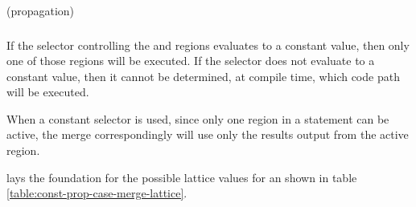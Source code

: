 \begin{algorithm}[h!]
  \label{algo:ccp-merge-loop-once}
  \caption{ (propagation)}
  \begin{algorithmic}[1]
    \STATE{}
    \STATE{}
    \STATE{}
        \STATE{}
      \ELSE
        \STATE{}
          \ENDIF
        \ENDFOR
      \ENDIF
    \ELSE
      \STATE{}
    \ENDIF
  \end{algorithmic}
\end{algorithm}

\subsubsection{}
\begin{observation}\label{obs:ccp-case-merge}
  If the selector controlling the  and
   regions evaluates to a constant value,
  then only one of those regions will be executed.  If the selector
  does not evaluate to a constant value, then it cannot be determined,
  at compile time, which code path will be executed.

  When a constant selector is used, since only one region in a
   statement can be active, the merge correspondingly will
  use only the results output from the active region.
\end{observation}

 lays the foundation for the possible lattice
values for an  shown in table
\ref{table:const-prop-case-merge-lattice}.

